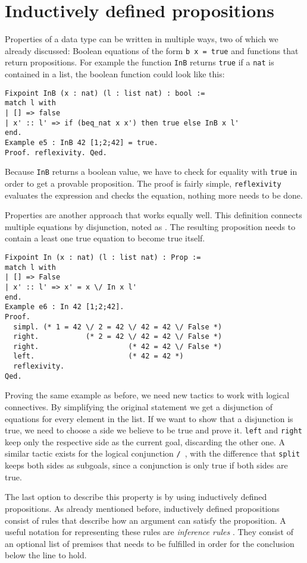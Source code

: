 \documentclass[fleqn]{scrreprt}
\newcommand{\coqinline}[1]{\texttt{#1}}
\begin{document}
\section{Inductively defined propositions}
Properties of a data type can be written in multiple ways, two of which we already discussed: Boolean equations of the form \coqinline{b x = true} and functions that return propositions. For example the function \coqinline{InB} returns \coqinline{true} if a \coqinline{nat} is contained in a list, the boolean function could look like this:
\begin{verbatim}
Fixpoint InB (x : nat) (l : list nat) : bool :=
match l with
| [] => false
| x' :: l' => if (beq_nat x x') then true else InB x l'
end.
Example e5 : InB 42 [1;2;42] = true.
Proof. reflexivity. Qed.
\end{verbatim}
Because \coqinline{InB} returns a boolean value, we have to check for equality with \coqinline{true} in order to get a provable proposition. The proof is fairly simple, \coqinline{reflexivity} evaluates the expression and checks the equation, nothing more needs to be done.
\par 
Properties are another approach that works equally well. This definition connects multiple equations by disjunction, noted as \coqinline{\/}. The resulting proposition needs to contain a least one true equation to become true itself.
\begin{verbatim}
Fixpoint In (x : nat) (l : list nat) : Prop :=
match l with
| [] => False
| x' :: l' => x' = x \/ In x l'
end.
Example e6 : In 42 [1;2;42].
Proof. 
  simpl. (* 1 = 42 \/ 2 = 42 \/ 42 = 42 \/ False *)
  right.           (* 2 = 42 \/ 42 = 42 \/ False *)
  right.                     (* 42 = 42 \/ False *)
  left.                      (* 42 = 42 *)
  reflexivity.
Qed.
\end{verbatim}
Proving the same example as before, we need new tactics to work with logical connectives. By simplifying the original statement we get a disjunction of equations for every element in the list. If we want to show that a disjunction is true, we need to choose a side we believe to be true and prove it. \coqinline{left} and \coqinline{right} keep only the respective side as the current goal, discarding the other one. A similar tactic exists for the logical conjunction \coqinline{/\ }, with the difference that \coqinline{split} keeps both sides as subgoals, since a conjunction is only true if both sides are true.
\par
The last option to describe this property is by using inductively defined propositions. As already mentioned before, inductively defined propositions consist of rules that describe how an argument can satisfy the proposition. A useful notation for representing these rules are \textit{inference rules} \label{infrules}. They consist of an optional list of premises that needs to be fulfilled in order for the conclusion below the line to hold.
\end{document}
